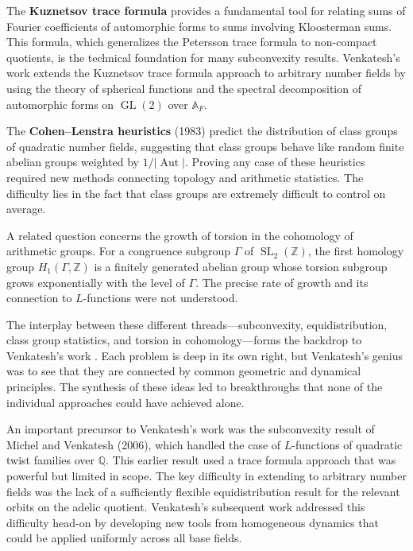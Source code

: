 The \textbf{Kuznetsov trace formula} provides a fundamental tool for relating sums of Fourier coefficients of automorphic forms to sums involving Kloosterman sums. This formula, which generalizes the Petersson trace formula to non-compact quotients, is the technical foundation for many subconvexity results. Venkatesh's work \cite{venkatesh2018} extends the Kuznetsov trace formula approach to arbitrary number fields by using the theory of spherical functions and the spectral decomposition of automorphic forms on $\operatorname{GL}(2)$ over $\mathbb{A}_F$.

The \textbf{Cohen--Lenstra heuristics} (1983) predict the distribution of class groups of quadratic number fields, suggesting that class groups behave like random finite abelian groups weighted by $1/|\operatorname{Aut}|$. Proving any case of these heuristics required new methods connecting topology and arithmetic statistics. The difficulty lies in the fact that class groups are extremely difficult to control on average.

A related question concerns the growth of torsion in the cohomology of arithmetic groups. For a congruence subgroup $\Gamma$ of $\operatorname{SL}_2(\mathbb{Z})$, the first homology group $H_1(\Gamma, \mathbb{Z})$ is a finitely generated abelian group whose torsion subgroup grows exponentially with the level of $\Gamma$. The precise rate of growth and its connection to $L$-functions were not understood.

The interplay between these different threads---subconvexity, equidistribution, class group statistics, and torsion in cohomology---forms the backdrop to Venkatesh's work \cite{venkatesh2018}. Each problem is deep in its own right, but Venkatesh's genius was to see that they are connected by common geometric and dynamical principles. The synthesis of these ideas led to breakthroughs that none of the individual approaches could have achieved alone.

An important precursor to Venkatesh's work \cite{venkatesh2018} was the subconvexity result of Michel and Venkatesh (2006), which handled the case of $L$-functions of quadratic twist families over $\mathbb{Q}$. This earlier result used a trace formula approach that was powerful but limited in scope. The key difficulty in extending to arbitrary number fields was the lack of a sufficiently flexible equidistribution result for the relevant orbits on the adelic quotient. Venkatesh's subsequent work addressed this difficulty head-on by developing new tools from homogeneous dynamics that could be applied uniformly across all base fields.

